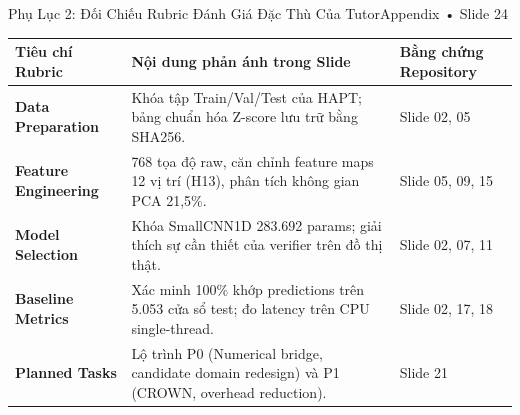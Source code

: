 \documentclass[aspectratio=169, 10pt]{beamer}
\begin{document}
\begin{frame}{Phụ Lục 2: Đối Chiếu Rubric Đánh Giá Đặc Thù Của Tutor}{Appendix • Slide 24}
    \small
    \begin{tabular}{lp{6cm}p{3.5cm}}
        \toprule
        \textbf{Tiêu chí Rubric} & \textbf{Nội dung phản ánh trong Slide} & \textbf{Bằng chứng Repository} \\
        \midrule
        \textbf{Data Preparation} & Khóa tập Train/Val/Test của HAPT; bảng chuẩn hóa Z-score lưu trữ bằng SHA256. & Slide 02, 05 \\
        \textbf{Feature Engineering} & 768 tọa độ raw, căn chỉnh feature maps 12 vị trí (H13), phân tích không gian PCA 21,5\%. & Slide 05, 09, 15 \\
        \textbf{Model Selection} & Khóa SmallCNN1D 283.692 params; giải thích sự cần thiết của verifier trên đồ thị thật. & Slide 02, 07, 11 \\
        \textbf{Baseline Metrics} & Xác minh 100\% khớp predictions trên 5.053 cửa sổ test; đo latency trên CPU single-thread. & Slide 02, 17, 18 \\
        \textbf{Planned Tasks} & Lộ trình P0 (Numerical bridge, candidate domain redesign) và P1 (CROWN, overhead reduction). & Slide 21 \\
        \bottomrule
    \end{tabular}
\end{frame}
\end{document}
